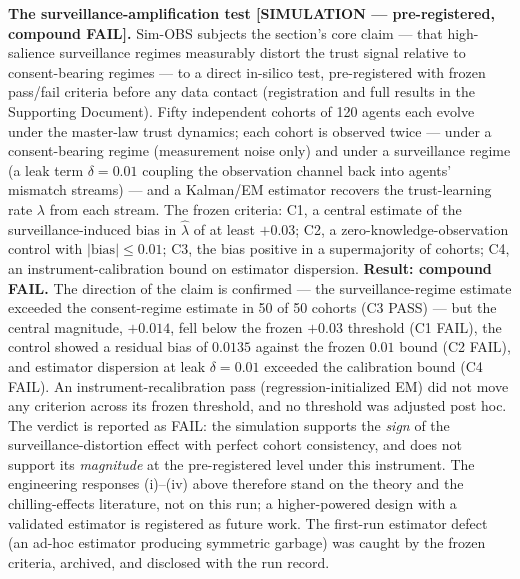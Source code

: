 \documentclass[11pt,twocolumn]{article}
\begin{document}
\textbf{The surveillance-amplification test {[}SIMULATION ---
pre-registered, compound FAIL{]}.} Sim-OBS subjects
the section's core claim --- that high-salience surveillance regimes
measurably distort the trust signal relative to consent-bearing regimes
--- to a direct in-silico test, pre-registered with frozen pass/fail
criteria before any data contact (registration and full results in the
Supporting Document). Fifty independent cohorts of 120 agents each
evolve under the master-law trust dynamics; each cohort is observed
twice --- under a consent-bearing regime (measurement noise only) and
under a surveillance regime (a leak term \(\delta = 0.01\) coupling the
observation channel back into agents' mismatch streams) --- and a
Kalman/EM estimator recovers the trust-learning rate \(\lambda\) from
each stream. The frozen criteria: C1, a central estimate of the
surveillance-induced bias in \(\hat{\lambda}\) of at least \(+0.03\);
C2, a zero-knowledge-observation control with \(|\mathrm{bias}| \leq
0.01\); C3, the bias positive in a supermajority of cohorts; C4, an
instrument-calibration bound on estimator dispersion. \textbf{Result:
compound FAIL.} The direction of the claim is confirmed --- the
surveillance-regime estimate exceeded the consent-regime estimate in
50 of 50 cohorts (C3 PASS) --- but the central magnitude, \(+0.014\),
fell below the frozen \(+0.03\) threshold (C1 FAIL), the control showed
a residual bias of \(0.0135\) against the frozen \(0.01\) bound (C2
FAIL), and estimator dispersion at leak \(\delta = 0.01\) exceeded the
calibration bound (C4 FAIL). An instrument-recalibration pass
(regression-initialized EM) did not move any criterion across its frozen
threshold, and no threshold was adjusted post hoc. The verdict is
reported as FAIL: the simulation supports the \emph{sign} of the
surveillance-distortion effect with perfect cohort consistency, and
does not support its \emph{magnitude} at the pre-registered level under
this instrument. The engineering responses (i)--(iv) above therefore
stand on the theory and the chilling-effects literature, not on this
run; a higher-powered design with a validated estimator is registered
as future work. The first-run estimator defect (an ad-hoc estimator
producing symmetric garbage) was caught by the frozen criteria,
archived, and disclosed with the run record.
\end{document}
